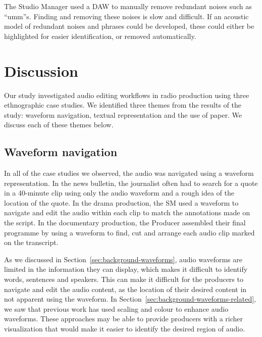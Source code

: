 The Studio Manager used a DAW to manually remove redundant noises such as ``umm''s.  Finding and removing these noises
is slow and difficult. If an acoustic model of redundant noises and phrases could be developed, these could either be
highlighted for easier identification, or removed automatically.

\section{Discussion}\label{sec:ethno-discussion}
Our study investigated audio editing workflows in radio production using three ethnographic case studies. We identified
three themes from the results of the study: waveform navigation, textual representation and the use of paper. We
discuss each of these themes below.

\subsection{Waveform navigation}
In all of the case studies we observed, the audio was navigated using a waveform representation.  In the news bulletin,
the journalist often had to search for a quote in a 40-minute clip using only the audio waveform and a rough idea of
the location of the quote.  In the drama production, the SM used a waveform to navigate and edit the audio within each
clip to match the annotations made on the script.  In the documentary production, the Producer assembled their final
programme by using a waveform to find, cut and arrange each audio clip marked on the transcript.

As we discussed in Section~\ref{sec:background-waveforms}, audio waveforms are limited in the information they can
display, which makes it difficult to identify words, sentences and speakers.  This can make it difficult for the
producers to navigate and edit the audio content, as the location of their desired content in not apparent using the
waveform. In Section~\ref{sec:background-waveforms-related}, we saw that previous work has used scaling and colour to
enhance audio waveforms. These approaches may be able to provide producers with a richer visualization that would make
it easier to identify the desired region of audio.


